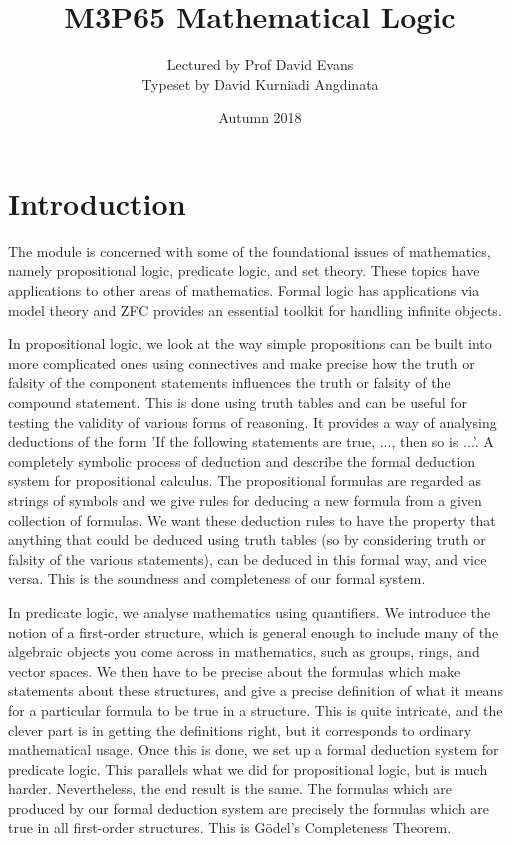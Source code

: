 \documentclass{article}
\title{M3P65 Mathematical Logic}
\author{Lectured by Prof David Evans \\ Typeset by David Kurniadi Angdinata}
\date{Autumn 2018}
\theoremstyle{definition}\newtheorem{definition}{Definition}[subsection]
\theoremstyle{definition}\newtheorem{remark}[definition]{Remark}
\theoremstyle{definition}\newtheorem*{example}{Example}
\theoremstyle{definition}\newtheorem*{note}{Note}
\begin{document}
\maketitle

\vfill

\tableofcontents

\pagebreak


\section{Introduction}

The module is concerned with some of the foundational issues of mathematics, namely propositional logic, predicate logic, and set theory. These topics have applications to other areas of mathematics. Formal logic has applications via model theory and ZFC provides an essential toolkit for handling infinite objects.

In propositional logic, we look at the way simple propositions can be built into more complicated ones using connectives and make precise how the truth or falsity of the component statements influences the truth or falsity of the compound statement. This is done using truth tables and can be useful for testing the validity of various forms of reasoning. It provides a way of analysing deductions of the form 'If the following statements are true, ..., then so is ...'. A completely symbolic process of deduction and describe the formal deduction system for propositional calculus. The propositional formulas are regarded as strings of symbols and we give rules for deducing a new formula from a given collection of formulas. We want these deduction rules to have the property that anything that could be deduced using truth tables (so by considering truth or falsity of the various statements), can be deduced in this formal way, and vice versa. This is the soundness and completeness of our formal system.

In predicate logic, we analyse mathematics using quantifiers. We introduce the notion of a first-order structure, which is general enough to include many of the algebraic objects you come across in mathematics, such as groups, rings, and vector spaces. We then have to be precise about the formulas which make statements about these structures, and give a precise definition of what it means for a particular formula to be true in a structure. This is quite intricate, and the clever part is in getting the definitions right, but it corresponds to ordinary mathematical usage. Once this is done, we set up a formal deduction system for predicate logic. This parallels what we did for propositional logic, but is much harder. Nevertheless, the end result is the same. The formulas which are produced by our formal deduction system are precisely the formulas which are true in all first-order structures. This is Gödel's Completeness Theorem.
\end{document}
